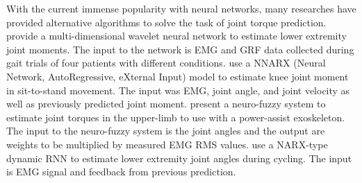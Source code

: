With the current immense popularity with neural networks, many researches have provided alternative algorithms to solve the task of joint torque prediction.
\textcite{Ardestani2014} provide a multi-dimensional wavelet neural network to estimate lower extremity joint moments. The input to the network is \ac{EMG} and \ac{GRF} data collected during gait trials of four patients with different conditions. \textcite{Lee14-1} use a NNARX (Neural Network, AutoRegressive, eXternal Input) model to estimate knee joint moment in sit-to-stand movement. The input was \ac{EMG}, joint angle, and joint velocity as well as previously predicted joint moment. \textcite{Kiguchi2012} present a neuro-fuzzy system to estimate joint torques in the upper-limb to use with a power-assist exoskeleton. The input to the neuro-fuzzy system is the joint angles and the output are weights to be multiplied by measured \ac{EMG} RMS values. \textcite{Cui2016} use a NARX-type dynamic \ac{RNN} to estimate lower extremity joint angles during cycling. The input is \ac{EMG} signal and feedback from previous prediction.
